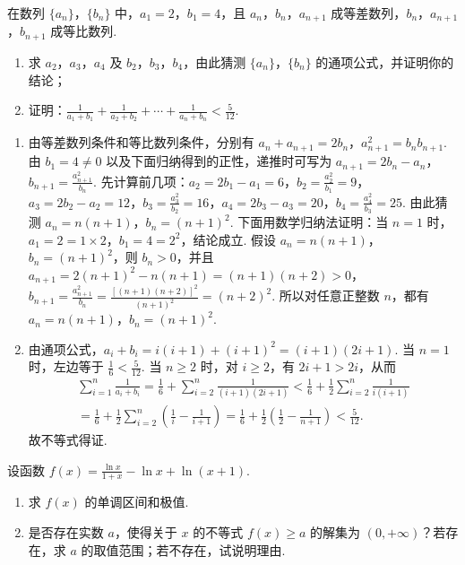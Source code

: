 \begin{problem}
在数列 \(\{a_n\}\)，\(\{b_n\}\) 中，\(a_1 = 2\)，\(b_1 = 4\)，且 \(a_n\)，\(b_n\)，\(a_{n+1}\) 成等差数列，\(b_n\)，\(a_{n+1}\)，\(b_{n+1}\) 成等比数列.

\begin{enumerate}
\item 求 \(a_{2}\)，\(a_{3}\)，\(a_{4}\) 及 \(b_{2}\)，\(b_{3}\)，\(b_{4}\)，由此猜测 \(\{a_{n}\}\)，\(\{b_{n}\}\) 的通项公式，并证明你的结论；
\item 证明：\(\frac{1}{a_1 + b_1} + \frac{1}{a_2 + b_2} + \cdots + \frac{1}{a_n + b_n} < \frac{5}{12}\).
\end{enumerate}
\end{problem}

\begin{solution}
\begin{enumerate}
\item 由等差数列条件和等比数列条件，分别有 \(a_n+a_{n+1}=2b_n\)，\(a_{n+1}^{2}=b_nb_{n+1}\). 由 \(b_1=4\ne0\) 以及下面归纳得到的正性，递推时可写为 \(a_{n+1}=2b_n-a_n\)，\(b_{n+1}=\frac{a_{n+1}^{2}}{b_n}\). 先计算前几项：\(a_2=2b_1-a_1=6\)，\(b_2=\frac{a_2^2}{b_1}=9\)，\(a_3=2b_2-a_2=12\)，\(b_3=\frac{a_3^2}{b_2}=16\)，\(a_4=2b_3-a_3=20\)，\(b_4=\frac{a_4^2}{b_3}=25\). 由此猜测 \(a_n=n(n+1)\)，\(b_n=(n+1)^2\). 下面用数学归纳法证明：当 \(n=1\) 时，\(a_1=2=1\times2\)，\(b_1=4=2^2\)，结论成立. 假设 \(a_n=n(n+1)\)，\(b_n=(n+1)^2\)，则 \(b_n>0\)，并且 \(a_{n+1}=2(n+1)^2-n(n+1)=(n+1)(n+2)>0\)，\(b_{n+1}=\frac{a_{n+1}^{2}}{b_n}=\frac{[(n+1)(n+2)]^2}{(n+1)^2}=(n+2)^2\). 所以对任意正整数 \(n\)，都有 \(a_n=n(n+1)\)，\(b_n=(n+1)^2\).

\item 由通项公式，\(a_i+b_i=i(i+1)+(i+1)^2=(i+1)(2i+1)\). 当 \(n=1\) 时，左边等于 \(\frac{1}{6}<\frac{5}{12}\). 当 \(n\geqslant2\) 时，对 \(i\geqslant2\)，有 \(2i+1>2i\)，从而
\[
\begin{gathered}
\sum_{i=1}^{n}\frac{1}{a_i+b_i}=\frac{1}{6}+\sum_{i=2}^{n}\frac{1}{(i+1)(2i+1)}<\frac{1}{6}+\frac{1}{2}\sum_{i=2}^{n}\frac{1}{i(i+1)}\\
=\frac{1}{6}+\frac{1}{2}\sum_{i=2}^{n}\left(\frac{1}{i}-\frac{1}{i+1}\right)=\frac{1}{6}+\frac{1}{2}\left(\frac{1}{2}-\frac{1}{n+1}\right)<\frac{5}{12}.
\end{gathered}
\]
故不等式得证.
\end{enumerate}
\end{solution}

\begin{problem}
设函数 \( f(x) = \frac{\ln x}{1 + x} - \ln x + \ln (x + 1) \).

\begin{enumerate}
\item 求 \( f(x) \) 的单调区间和极值.
\item 是否存在实数 \(a\)，使得关于 \(x\) 的不等式 \(f(x) \geqslant a\) 的解集为 \((0, +\infty)\)？若存在，求 \(a\) 的取值范围；若不存在，试说明理由.
\end{enumerate}
\end{problem}

